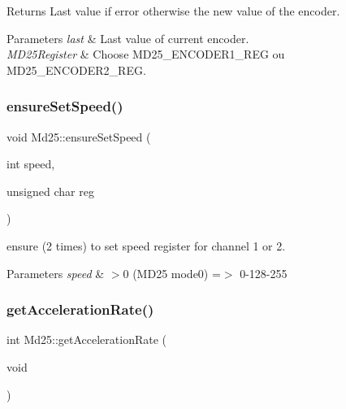 \begin{DoxyReturn}{Returns}
Last value if error otherwise the new value of the encoder. 
\end{DoxyReturn}

\begin{DoxyParams}{Parameters}
{\em last} & Last value of current encoder. \\
\hline
{\em M\+D25\+Register} & Choose M\+D25\+\_\+\+E\+N\+C\+O\+D\+E\+R1\+\_\+\+R\+EG ou M\+D25\+\_\+\+E\+N\+C\+O\+D\+E\+R2\+\_\+\+R\+EG. \\
\hline
\end{DoxyParams}
\mbox{\label{classMd25_a0b8767325de548ebb8b75bf6f9bbcd77}} 
\subsubsection{\texorpdfstring{ensure\+Set\+Speed()}{ensureSetSpeed()}}
{\footnotesize\ttfamily void Md25\+::ensure\+Set\+Speed (\begin{DoxyParamCaption}\item[{int}]{speed,  }\item[{unsigned char}]{reg }\end{DoxyParamCaption})}



ensure (2 times) to set speed register for channel 1 or 2. 


\begin{DoxyParams}{Parameters}
{\em speed} & $>$0 (M\+D25 mode0) =$>$ 0-\/128-\/255 \\
\hline
\end{DoxyParams}
\mbox{\label{classMd25_a50bd56e7105bb66c2392fc6f6708f0d1}} 
\subsubsection{\texorpdfstring{get\+Acceleration\+Rate()}{getAccelerationRate()}}
{\footnotesize\ttfamily int Md25\+::get\+Acceleration\+Rate (\begin{DoxyParamCaption}\item[{void}]{ }\end{DoxyParamCaption})}



